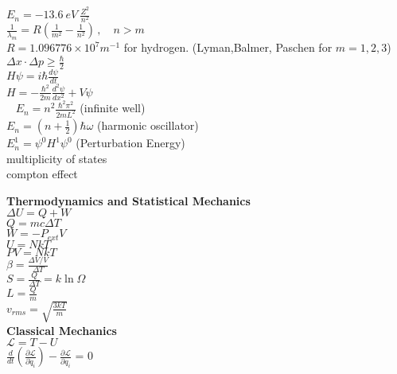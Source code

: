 \documentclass[12pt]{article}
\begin{document}
\begin{twocolumn}
\begin{flushleft}
\medskip
$\displaystyle  E_n = -13.6~eV~\frac{Z^2}{n^2}$ \\
\medskip
$\displaystyle \frac{1}{\lambda_m}=R\left( \frac{1}{m^2} - \frac{1}{n^2}\right) \, , \quad n>m $\\
$R=1.096776\times 10^7 m^{-1}$ for hydrogen. (Lyman,Balmer, Paschen for  $m=1,2,3$)
\medskip
$\displaystyle \Delta x \cdot \Delta  p \geq \frac{\hbar}{2} $ \\
\medskip
$\displaystyle H \psi=i \hbar \frac{d\psi}{dt} $ \\
\medskip
$\displaystyle H=-\frac{\hbar^2}{2m}\frac{d^2 \psi}{dx^2}+V\psi $\\\
\medskip
$\displaystyle E_n=n^2 \frac{\hbar^2 \pi^2}{2mL^2} $  (infinite well)\\ 
\medskip
$\displaystyle E_n=\left(n+\frac{1}{2} \right) \hbar \omega $ (harmonic oscillator)\\ 
\medskip
$\displaystyle E_n^1= \psi^0 H^1 \psi^0 $ (Perturbation Energy)\\
\medskip
multiplicity of states \\
\medskip
compton effect

\newpage
{\bf Thermodynamics and Statistical Mechanics} \\
\bigskip
$\displaystyle \Delta U = Q + W$\\ 
\medskip
$\displaystyle Q=mc\Delta T$\\
\medskip
$W=-P_{ext}V$\\
\medskip
$U=NkT$\\
\medskip
$PV=NkT$\\
\medskip
$\displaystyle \beta = \frac{\Delta V/V}{\Delta T}$\\
\medskip
$\displaystyle S = \frac{Q}{\Delta T} = k \ln \Omega$\\
\medskip
$\displaystyle L = \frac{Q}{m}$\\
\medskip
$\displaystyle v_{rms} = \sqrt{\frac{3 k T}{m}} $ \\
\medskip
{\bf Classical Mechanics} \\
\bigskip
$\displaystyle \mathcal{L} = T - U$ \\
\medskip
$\displaystyle \frac{d}{dt}\left(\frac{\partial \mathcal{L}}{\partial \dot{q}_{i}}\right) - \frac{\partial \mathcal{L}}{\partial q_{i}}$ = 0 \\
\bigskip


\end{flushleft}
\end{twocolumn}
\end{document}
